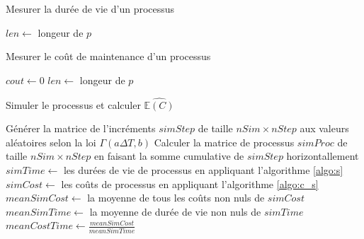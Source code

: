 \documentclass[10pt,a4paper]{article}
\begin{document}
\begin{algorithm}[!h]
    \caption{Mesurer la durée de vie d'un processus}
    \label{algo:s}
    $len \leftarrow $ longeur de $p$\;
\end{algorithm}

\begin{algorithm}[!h]
    \caption{Mesurer le coût de maintenance d'un processus}
    \label{algo:c_s}
    $cout \leftarrow 0$\;
    $len \leftarrow $ longeur de $p$\;
\end{algorithm}

\begin{algorithm}[!h]
    \caption{Simuler le processus et calculer $\widehat{\mathbb{E}(C)}$}
    \label{algo:e_c}
    Générer la matrice de l'incréments $simStep$ de taille $nSim \times nStep$ aux valeurs aléatoires selon la loi $\Gamma(a\Delta T, b)$\;
    Calculer la matrice de processus $simProc$ de taille $nSim \times nStep$ en faisant la somme cumulative de $simStep$ horizontallement\;
    $simTime \leftarrow$ les durées de vie de processus en appliquant l'algorithme \eqref{algo:s}\;
    $simCost \leftarrow$ les coûts de processus en appliquant l'algorithme \eqref{algo:c_s}\;
    $meanSimCost \leftarrow$ la moyenne de tous les coûts non nuls de $simCost$\;
    $meanSimTime \leftarrow$ la moyenne de durée de vie non nuls de $simTime$\;
    $meanCostTime \leftarrow \frac{meanSimCost}{meanSimTime}$\;
\end{algorithm}
\end{document}
